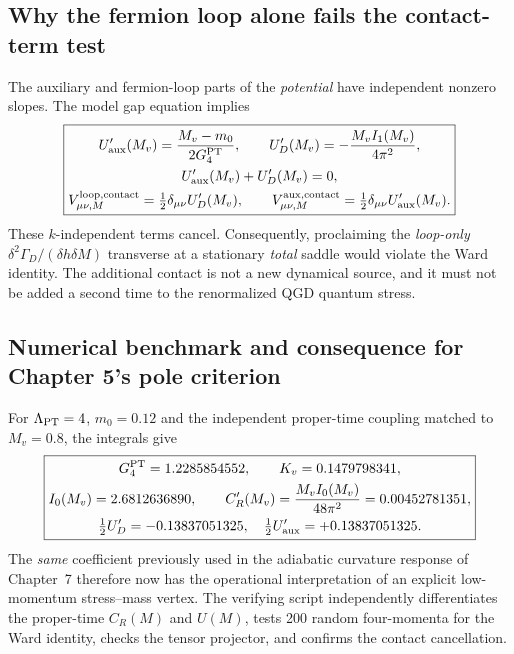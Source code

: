 \documentclass[11pt,a4paper]{article}
\theoremstyle{remark}\newtheorem{remark}[theorem]{Remark}
\begin{document}
\subsection{Why the fermion loop alone fails the contact-term test}
The auxiliary and fermion-loop parts of the \emph{potential} have independent nonzero slopes. The model gap equation implies
\begin{equation}\label{eq:v35-contact}
\boxed{\begin{gathered}
U'_{\rm aux}(M_v)=\frac{M_v-m_0}{2G_4^{\rm PT}},\qquad
U'_{D}(M_v)=-\frac{M_vI_1(M_v)}{4\pi^2},\\
U'_{\rm aux}(M_v)+U'_D(M_v)=0,\\
V_{\mu\nu,M}^{\rm loop,contact}=\tfrac12\delta_{\mu\nu}U'_D(M_v),\qquad
V_{\mu\nu,M}^{\rm aux,contact}=\tfrac12\delta_{\mu\nu}U'_{\rm aux}(M_v).
\end{gathered}}
\end{equation}
These $k$-independent terms cancel. Consequently, proclaiming the \emph{loop-only} $\delta^2\Gamma_D/(\delta h\delta M)$ transverse at a stationary \emph{total} saddle would violate the Ward identity. The additional contact is not a new dynamical source, and it must not be added a second time to the renormalized QGD quantum stress.

\subsection{Numerical benchmark and consequence for Chapter 5's pole criterion}
For $\Lambda_{\rm PT}=4$, $m_0=0.12$ and the independent proper-time coupling matched to $M_v=0.8$, the integrals give
\begin{equation}\label{eq:v35-numbers}
\boxed{\begin{gathered}
G_4^{\rm PT}=1.2285854552,\qquad K_v=0.1479798341,\\
I_0(M_v)=2.6812636890,\qquad C_R'(M_v)=\frac{M_vI_0(M_v)}{48\pi^2}=0.00452781351,\\
\tfrac12U'_D=-0.13837051325,\quad\tfrac12U'_{\rm aux}=+0.13837051325.
\end{gathered}}
\end{equation}
The \emph{same} coefficient previously used in the adiabatic curvature response of Chapter~7 therefore now has the operational interpretation of an explicit low-momentum stress--mass vertex. The verifying script independently differentiates the proper-time $C_R(M)$ and $U(M)$, tests 200 random four-momenta for the Ward identity, checks the tensor projector, and confirms the contact cancellation.
\end{document}
